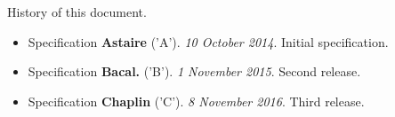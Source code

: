 History of this document.

\begin{itemize}
\item Specification \textbf{Astaire} ('A'). \textit{10 October 2014}. Initial specification.
\item Specification \textbf{Bacal.} ('B'). \textit{1 November 2015}. Second release.
\item Specification \textbf{Chaplin} ('C'). \textit{8 November 2016}. Third release.
\end{itemize}
